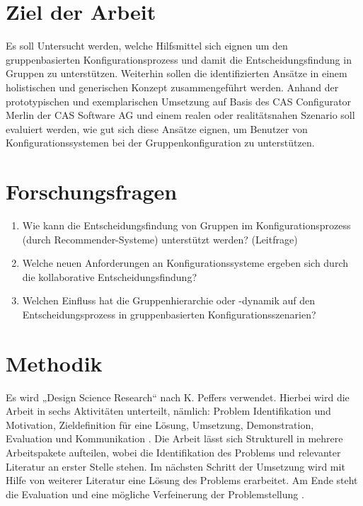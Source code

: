 \documentclass[12pt]{article}
\begin{document}
\section{Ziel der Arbeit}

Es soll Untersucht werden, welche Hilfsmittel sich eignen um den gruppenbasierten Konfigurationsprozess und damit die Entscheidungsfindung in Gruppen zu unterstützen. Weiterhin sollen die identifizierten Ansätze in einem holistischen und generischen Konzept zusammengeführt werden. Anhand der prototypischen und exemplarischen Umsetzung auf Basis des CAS Configurator Merlin der CAS Software AG und einem realen oder realitätsnahen Szenario soll evaluiert werden, wie gut sich diese Ansätze eignen, um Benutzer von Konfigurationssystemen bei der Gruppenkonfiguration zu unterstützen. 

\section{Forschungsfragen}

\begin{enumerate}
    \item Wie kann die Entscheidungsfindung von Gruppen im Konfigurationsprozess (durch Recommender-Systeme) unterstützt werden? (Leitfrage)
    \item Welche neuen Anforderungen an Konfigurationssysteme ergeben sich durch die kollaborative Entscheidungsfindung?
    \item Welchen Einfluss hat die Gruppenhierarchie oder -dynamik auf den Entscheidungsprozess in gruppenbasierten Konfigurationsszenarien?
\end{enumerate}

\section{Methodik}

Es wird „Design Science Research“ nach K. Peffers verwendet. Hierbei wird die Arbeit in sechs Aktivitäten unterteilt, nämlich: Problem Identifikation und Motivation, Zieldefinition für eine Lösung, Umsetzung, Demonstration, Evaluation und  Kommunikation \cite{peffersDesignScienceResearch2007}. Die Arbeit lässt sich Strukturell in mehrere Arbeitspakete aufteilen, wobei die Identifikation des Problems und relevanter Literatur an erster Stelle stehen. Im nächsten Schritt der Umsetzung wird mit Hilfe von weiterer Literatur eine Lösung des Problems erarbeitet. Am Ende steht die Evaluation und eine mögliche Verfeinerung der Problemstellung \cite{offermannOutlineDesignScience2009}.

\printbibliography[heading=bibintoc]
\end{document}

